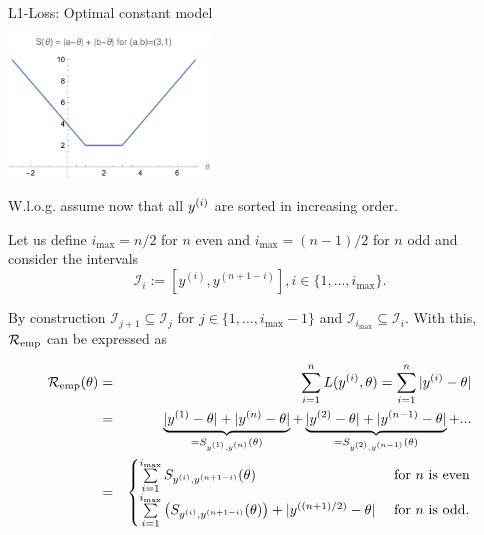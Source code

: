 \documentclass[11pt,compress,t,notes=noshow, xcolor=table]{beamer}
\begin{document}
\begin{vbframe}{L1-Loss: Optimal constant model}
\begin{itemize}
\vspace*{-0.15cm}

\begin{center}
\includegraphics[width = 0.4\textwidth ]{figure_man/S_function_plot.pdf} \\
\end{center}



  \framebreak

  W.l.o.g. assume now that all $\yi$ are sorted in increasing order.

  Let us define $i_{\max} = n / 2$ for $n$ even and $i_{\max} = (n - 1) / 2$ for $n$ odd and consider the intervals 
  $$
    \mathcal{I}_i := [y^{(i)},y^{(n+1-i)}], i \in \{1, ..., i_{\max}\}. 
  $$

  By construction $\mathcal{I}_{j+1} \subseteq \mathcal{I}_j$ for $j \in \{1,\dots,i_{\max}-1\}$ and $\mathcal{I}_{i_{\max}} \subseteq \mathcal{I}_i$. With this, $\riske$ can be expressed as
  \begin{footnotesize}
  \begin{eqnarray*}
  \riske(\theta) &=& \sumin L(\yi,\theta) = \sumin|\yi - \theta| \\ 
  &=& \underbrace{|\yi[1] - \theta| + |\yi[n] - \theta|}_{= S_{\yi[1], \yi[n]}(\theta)} + \underbrace{|\yi[2] - \theta| + |\yi[n - 1] - \theta|}_{= S_{\yi[2], \yi[n - 1]}(\theta)} + ...  \\
  &=& \begin{cases} \sum\limits_{i = 1}^{i_{\max}} S_{\yi, \yi[n + 1 - i]}(\theta) & \text{ for } n \text{ is even} \\
  \sum\limits_{i = 1}^{i_{\max}} \left(S_{\yi, \yi[n + 1 - i]}(\theta)\right) + |\yi[(n + 1)/2] - \theta| & \text{ for } n \text{ is odd}. \end{cases}
  \end{eqnarray*}
  \end{footnotesize}


\end{itemize}
\end{vbframe}
\end{document}
